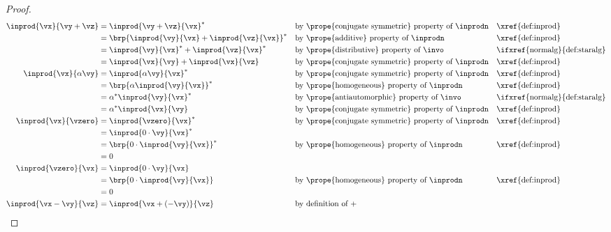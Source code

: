 \begin{proof}
{\begin{align*}
  \inprod{\vx}{\vy+\vz}
    &= \inprod{\vy+\vz}{\vx}^\ast
    && \text{by \prope{conjugate symmetric} property of $\inprodn$}
    && \text{\xref{def:inprod}}
  \\&= \brp{\inprod{\vy}{\vx} + \inprod{\vz}{\vx}}^\ast
    && \text{by \prope{additive} property of $\inprodn$}
    && \text{\xref{def:inprod}}
  \\&= \inprod{\vy}{\vx}^\ast + \inprod{\vz}{\vx}^\ast
    && \text{by \prope{distributive} property of $\invo$}
    && \text{\ifxref{normalg}{def:staralg}}
  \\&= \inprod{\vx}{\vy} + \inprod{\vx}{\vz}
    && \text{by \prope{conjugate symmetric} property of $\inprodn$}
    && \text{\xref{def:inprod}}
  \\
  \inprod{\vx}{\alpha\vy} 
    &= \inprod{\alpha\vy}{\vx}^\ast
    && \text{by \prope{conjugate symmetric} property of $\inprodn$}
    && \text{\xref{def:inprod}}
  \\&= \brp{\alpha\inprod{\vy}{\vx}}^\ast 
    && \text{by \prope{homogeneous} property of $\inprodn$}
    && \text{\xref{def:inprod}}
  \\&= \alpha^\ast \inprod{\vy}{\vx}^\ast 
    && \text{by \prope{antiautomorphic} property of $\invo$}
    && \text{\ifxref{normalg}{def:staralg}}
  \\&= \alpha^\ast \inprod{\vx}{\vy}
    && \text{by \prope{conjugate symmetric} property of $\inprodn$}
    && \text{\xref{def:inprod}}
  \\
  \inprod{\vx}{\vzero}    
    &= \inprod{\vzero}{\vx}^\ast
    && \text{by \prope{conjugate symmetric} property of $\inprodn$}
    && \text{\xref{def:inprod}}
  \\&= \inprod{0\cdot\vy}{\vx}^\ast
  \\&= \brp{0\cdot\inprod{\vy}{\vx}}^\ast
    && \text{by \prope{homogeneous} property of $\inprodn$}
    && \text{\xref{def:inprod}}
  \\&= 0
  \\
  \inprod{\vzero}{\vx}    
    &= \inprod{0\cdot\vy}{\vx}
  \\&= \brp{0\cdot\inprod{\vy}{\vx}}
    && \text{by \prope{homogeneous} property of $\inprodn$}
    && \text{\xref{def:inprod}}
  \\&= 0
  \\
  \inprod{\vx-\vy}{\vz} 
    &= \inprod{\vx+(-\vy)}{\vz}               
    && \text{by definition of $+$}

\end{align*}}
\end{proof}
